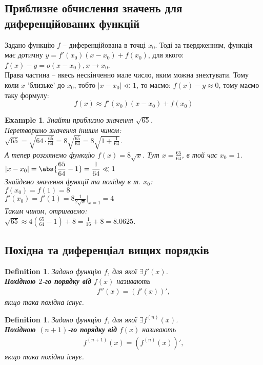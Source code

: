 \documentclass[a4paper, 14pt]{article}
\theoremstyle{theoremdd}
\theoremstyle{theoremdd}
\newtheorem{definition}[theorem]{Definition}
\theoremstyle{theoremdd}
\theoremstyle{theoremdd}
\newtheorem{example}[theorem]{Example}
\theoremstyle{theoremdd}
\theoremstyle{theoremdd}
\theoremstyle{theoremdd}
\theoremstyle{theoremdd}
\begin{document}
\subsection{Приблизне обчислення значень для диференційованих функцій}
Задано функцію $f$ -- диференційована в точці $x_0$. Тоді за твердженням, функція має дотичну $y = f'(x_0)(x-x_0)+f(x_0)$, для якого:\\
$f(x)-y = o(x-x_0), x \to x_0$.\\
Права частина -- якесь нескінченно мале число, яким можна знехтувати.
Тому коли $x$ 'близьке' до $x_0$, тобто $|x-x_0| \ll 1$, то маємо: $f(x) -y \approx 0$, тому маємо таку формулу: 
$$f(x) \approx f'(x_0)(x-x_0)+f(x_0)$$

\begin{example}
Знайти приблизно значення $\sqrt{65}$.\\
Перетворимо значення іншим чином:\\
$\sqrt{65} \displaystyle = \sqrt{64 \cdot \frac{65}{64}} = 8 \sqrt{\frac{65}{64}} = 8 \sqrt{1 + \frac{1}{64}}$.\\
А тепер розглянемо функцію $f(x) = 8\sqrt{x}$. Тут $x = \displaystyle \frac{65}{64}$, в той час $x_0 = 1$.\\
$|x-x_0| = \displaystyle \abs{\frac{65}{64} - 1} = \frac{1}{64} \ll 1$\\
Знайдемо значення функції та похідну в т. $x_0$:\\
$f(x_0) = f(1) = 8$\\
$f'(x_0) = f'(1) = \displaystyle 8\frac{1}{2 \sqrt{x}} |_{x = 1} = 4$\\
Таким чином, отримаємо:\\
$\sqrt{65} \approx \displaystyle 4\left(\frac{65}{64}-1\right)+8 = \frac{1}{16} + 8 = 8.0625$.
\end{example}

\subsection{Похідна та диференціал вищих порядків}
\begin{definition}
Задано функцію $f$, для якої $\exists f'(x)$.\\
\textbf{Похідною $2$-го порядку від} $f(x)$ називають
\begin{align*}
f''(x) = (f'(x))',
\end{align*}
якщо така похідна існує.
\end{definition}

\begin{definition}
Задано функцію $f$, для якої $\exists f^{(n)}(x)$.\\
\textbf{Похідною $(n+1)$-го порядку від} $f(x)$ називають
\begin{align*}
f^{(n+1)}(x) = (f^{(n)}(x))',
\end{align*}
якщо така похідна існує.
\end{definition}
\end{document}
